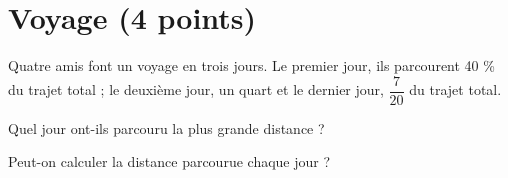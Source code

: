 \section{Voyage (4 points)}

Quatre amis font un voyage en trois jours. Le premier jour, ils parcourent 40 \% du trajet total ; le deuxième jour, un quart et le dernier jour, $\dfrac{7}{20}$ du trajet total.

\begin{questions}
	\question[2] Quel jour ont-ils parcouru la plus grande distance ?
	
	\question[2] Peut-on calculer la distance parcourue chaque jour ?
\end{questions}